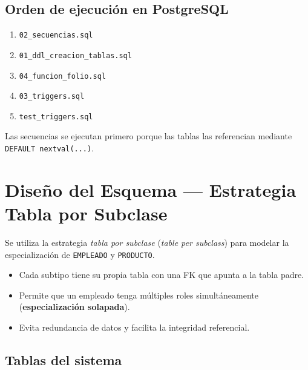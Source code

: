 \documentclass[12pt, a4paper]{article}
\begin{document}
\subsection{Orden de ejecuci\'on en PostgreSQL}

\begin{enumerate}
    \item \texttt{02\_secuencias.sql}
    \item \texttt{01\_ddl\_creacion\_tablas.sql}
    \item \texttt{04\_funcion\_folio.sql}
    \item \texttt{03\_triggers.sql}
    \item \texttt{test\_triggers.sql}
\end{enumerate}

Las secuencias se ejecutan primero porque las tablas las referencian mediante \texttt{DEFAULT nextval(...)}.

\section{Dise\~no del Esquema --- Estrategia Tabla por Subclase}

Se utiliza la estrategia \textit{tabla por subclase} (\textit{table per subclass}) para modelar la especializaci\'on de \texttt{EMPLEADO} y \texttt{PRODUCTO}.

\begin{itemize}
    \item Cada subtipo tiene su propia tabla con una FK que apunta a la tabla padre.
    \item Permite que un empleado tenga m\'ultiples roles simult\'aneamente (\textbf{especializaci\'on solapada}).
    \item Evita redundancia de datos y facilita la integridad referencial.
\end{itemize}

\subsection{Tablas del sistema}
\end{document}
